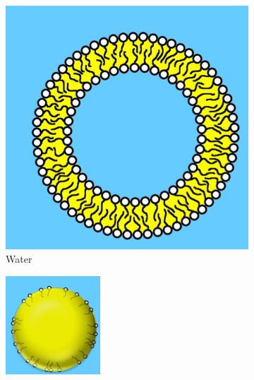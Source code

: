 \documentclass[]{article}
\begin{document}
\begin{figure}[H]
	\centering
	\caption{Self-assembled structures}
	\label{fig:self-assembled-structures}
	\begin{subfigure}[b]{0.3\textwidth}
		\centering
		\includegraphics[width=\textwidth]{SelfAssembled1}
		\caption{Water}
		\label{fig:water}
	\end{subfigure}
	\hfill
	\begin{subfigure}[b]{0.3\textwidth}
		\centering
		\includegraphics[width=\textwidth]{SelfAssembled2}

\end{subfigure}
\end{figure}
\end{document}
